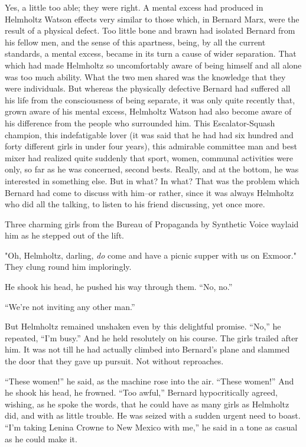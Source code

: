 \documentclass[12pt]{report}
\begin{document}
Yes, a little too able; they were right. A mental excess had produced in
Helmholtz Watson effects very similar to those which, in Bernard Marx,
were the result of a physical defect. Too little bone and brawn had
isolated Bernard from his fellow men, and the sense of this apartness,
being, by all the current standards, a mental excess, became in its turn
a cause of wider separation. That which had made Helmholtz so
uncomfortably aware of being himself and all alone was too much ability.
What the two men shared was the knowledge that they were individuals.
But whereas the physically defective Bernard had suffered all his life
from the consciousness of being separate, it was only quite recently
that, grown aware of his mental excess, Helmholtz Watson had also become
aware of his difference from the people who surrounded him. This
Escalator-Squash champion, this indefatigable lover (it was said that he
had had six hundred and forty different girls in under four years), this
admirable committee man and best mixer had realized quite suddenly that
sport, women, communal activities were only, so far as he was concerned,
second bests. Really, and at the bottom, he was interested in something
else. But in what? In what? That was the problem which Bernard had come
to discuss with him--or rather, since it was always Helmholtz who did
all the talking, to listen to his friend discussing, yet once more.

Three charming girls from the Bureau of Propaganda by Synthetic Voice
waylaid him as he stepped out of the lift.

"Oh, Helmholtz, darling, \emph{do} come and have a picnic supper with us
on Exmoor." They clung round him imploringly.

He shook his head, he pushed his way through them. ``No, no.''

``We're not inviting any other man.''

But Helmholtz remained unshaken even by this delightful promise. ``No,''
he repeated, ``I'm busy.'' And he held resolutely on his course. The
girls trailed after him. It was not till he had actually climbed into
Bernard's plane and slammed the door that they gave up pursuit. Not
without reproaches.

``These women!'' he said, as the machine rose into the air. ``These
women!'' And he shook his head, he frowned. ``Too awful,'' Bernard
hypocritically agreed, wishing, as he spoke the words, that he could
have as many girls as Helmholtz did, and with as little trouble. He was
seized with a sudden urgent need to boast. ``I'm taking Lenina Crowne to
New Mexico with me,'' he said in a tone as casual as he could make it.
\end{document}
